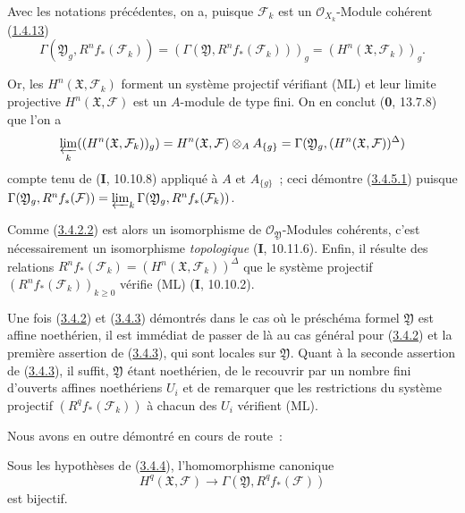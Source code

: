 \begin{env}[3.4.5]
Avec les notations précédentes, on a, puisque $\mathcal F_k$ est un
$\mathcal O_{X_k}$-Module cohérent (\hyperref[III.1.4.13-fr]{1.4.13})
\[
\Gamma(\mathfrak Y_g,R^nf_*(\mathcal F_k))
=(\Gamma(\mathfrak Y,R^nf_*(\mathcal F_k)))_g
=(H^n(\mathfrak X,\mathcal F_k))_g.
\]

Or, les $H^n(\mathfrak X,\mathcal F_k)$ forment un système projectif
vérifiant (ML) et leur limite projective $H^n(\mathfrak X,\mathcal F)$ est
un $A$-module de type fini. On en conclut (\textbf{0}, 13.7.8) que l'on a
\[
\varprojlim_k((H^n(\mathfrak X,\mathcal F_k))_g)
=H^n(\mathfrak X,\mathcal F)\otimes_AA_{\{g\}}
=\Gamma(\mathfrak Y_g,(H^n(\mathfrak X,\mathcal F))^\Delta)
\]
compte tenu de (\textbf{I}, 10.10.8) appliqué à $A$ et $A_{\{g\}}$~; ceci démontre
(\hyperref[III.3.4.5.1-fr]{3.4.5.1}) puisque
$\Gamma(\mathfrak Y_g,R^nf_*(\mathcal F))
=\varprojlim_k\Gamma(\mathfrak Y_g,R^nf_*(\mathcal F_k))$.

Comme (\hyperref[III.3.4.2.2-fr]{3.4.2.2}) est alors un isomorphisme de
$\mathcal O_{\mathfrak Y}$-Modules cohérents, c'est nécessairement un
isomorphisme \emph{topologique} (\textbf{I}, 10.11.6). Enfin, il résulte des relations
$R^nf_*(\mathcal F_k)=(H^n(\mathfrak X,\mathcal F_k))^\Delta$ que le système
projectif $(R^nf_*(\mathcal F_k))_{k\geq0}$ vérifie (ML) (\textbf{I}, 10.10.2).

Une fois (\hyperref[III.3.4.2-fr]{3.4.2}) et
(\hyperref[III.3.4.3-fr]{3.4.3}) démontrés dans le cas où le préschéma formel
$\mathfrak Y$ est affine noethérien, il est immédiat de passer de là au cas
général pour (\hyperref[III.3.4.2-fr]{3.4.2}) et la première assertion de
(\hyperref[III.3.4.3-fr]{3.4.3}), qui sont locales sur $\mathfrak Y$. Quant à
la seconde assertion de (\hyperref[III.3.4.3-fr]{3.4.3}), il suffit,
$\mathfrak Y$ étant noethérien, de le recouvrir par un nombre fini d'ouverts
affines noethériens $U_i$ et de remarquer que les restrictions du système
projectif $(R^qf_*(\mathcal F_k))$ à chacun des $U_i$ vérifient (ML).
\end{env}

Nous avons en outre démontré en cours de route~:

\begin{corollary}[3.4.6]
\label{III.3.4.6-fr}
Sous les hypothèses de \textup{(\hyperref[III.3.4.4-fr]{3.4.4})}, l'homomorphisme
canonique
\[
H^q(\mathfrak X,\mathcal F)
\longrightarrow\Gamma(\mathfrak Y,R^qf_*(\mathcal F))
\tag{3.4.6.1}\label{III.3.4.6.1-fr}
\]
est bijectif.
\end{corollary}

